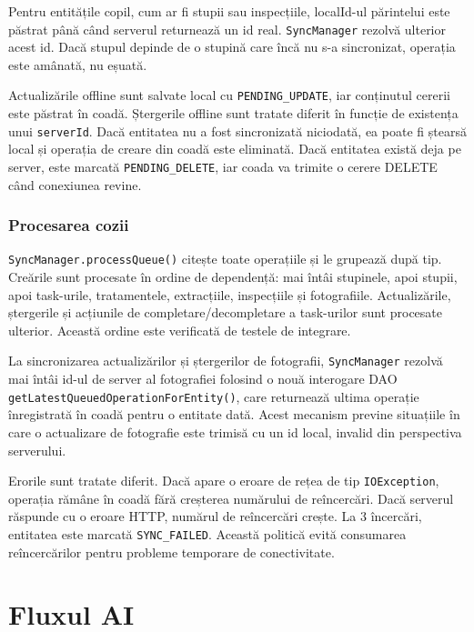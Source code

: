 Pentru entitățile copil, cum ar fi stupii sau inspecțiile, localId-ul părintelui este păstrat până când serverul returnează un id real. \texttt{SyncManager} rezolvă ulterior acest id. Dacă stupul depinde de o stupină care încă nu s-a sincronizat, operația este amânată, nu eșuată.

Actualizările offline sunt salvate local cu \texttt{PENDING\_UPDATE}, iar conținutul cererii este păstrat în coadă. Ștergerile offline sunt tratate diferit în funcție de existența unui \texttt{serverId}. Dacă entitatea nu a fost sincronizată niciodată, ea poate fi ștearsă local și operația de creare din coadă este eliminată. Dacă entitatea există deja pe server, este marcată \texttt{PENDING\_DELETE}, iar coada va trimite o cerere DELETE când conexiunea revine.

\subsubsection*{Procesarea cozii}

\texttt{SyncManager.processQueue()} citește toate operațiile și le grupează după tip. Creările sunt procesate în ordine de dependență: mai întâi stupinele, apoi stupii, apoi task-urile, tratamentele, extracțiile, inspecțiile și fotografiile. Actualizările, ștergerile și acțiunile de completare/decompletare a task-urilor sunt procesate ulterior. Această ordine este verificată de testele de integrare.

La sincronizarea actualizărilor și ștergerilor de fotografii, \texttt{SyncManager} rezolvă mai întâi id-ul de server al fotografiei folosind o nouă interogare DAO \texttt{getLatestQueuedOperationForEntity()}, care returnează ultima operație înregistrată în coadă pentru o entitate dată. Acest mecanism previne situațiile în care o actualizare de fotografie este trimisă cu un id local, invalid din perspectiva serverului.

Erorile sunt tratate diferit. Dacă apare o eroare de rețea de tip \texttt{IOException}, operația rămâne în coadă fără creșterea numărului de reîncercări. Dacă serverul răspunde cu o eroare HTTP, numărul de reîncercări crește. La 3 încercări, entitatea este marcată \texttt{SYNC\_FAILED}. Această politică evită consumarea reîncercărilor pentru probleme temporare de conectivitate.

\section{Fluxul AI}

